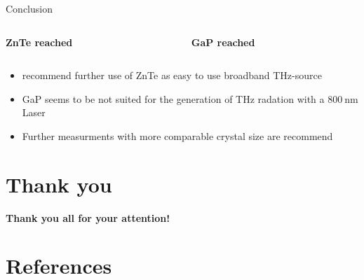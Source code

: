 \documentclass[aspectratio=1610, 9pt]{beamer}
\begin{document}
\begin{frame}{Conclusion}
  \begin{center}
  \begin{columns}
    \begin{column}{0.5\textwidth}
      \textbf{ZnTe reached}\\
    \end{column}
    \begin{column}{.5\textwidth}
      \textbf{GaP reached}\\
    \end{column}
  \end{columns}
  \vspace{0.2in}
  \begin{itemize}
  \item recommend further use of ZnTe as easy to use broadband THz-source
  \item GaP seems to be not suited for the generation of THz radation with a $\SI{800}{\nano\meter}$ Laser
  \item Further measurments with more comparable crystal size are recommend
  \end{itemize}
  \end{center}
\end{frame}

\section*{Thank you}
\begin{frame}{}
  \begin{center}
  \textbf{\textcolor{tugreen}{Thank you all for your attention!}}
  \end{center}
\end{frame}

\section{References }
\printbibliography
\end{document}
